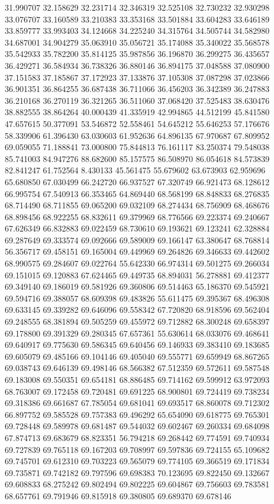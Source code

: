 31.990707
32.158629
32.231714
32.346319
32.525108
32.730232
32.930298
33.076707
33.160589
33.210383
33.353168
33.501884
33.604283
33.646189
33.859777
33.993403
34.124668
34.225240
34.315764
34.505744
34.582980
34.687001
34.904279
35.063910
35.056721
35.174088
35.340022
35.568578
35.542933
35.782200
35.814125
35.987856
36.196870
36.299275
36.435657
36.429271
36.584934
36.738326
36.880146
36.894175
37.048588
37.080900
37.151583
37.185867
37.172923
37.133876
37.105308
37.087298
37.023866
36.901351
36.864255
36.687438
36.711066
36.456203
36.342389
36.247883
36.210168
36.270119
36.321265
36.511060
37.068420
37.525483
38.630476
38.882555
38.864264
40.000439
41.335919
42.994865
44.512199
45.841580
47.657615
50.377091
53.546872
52.558461
54.645212
55.646253
57.176676
58.339906
61.396430
63.030603
61.952636
64.896135
67.970687
67.809952
69.059055
71.188841
73.000800
75.844813
76.161117
83.250374
79.548038
85.741003
84.947276
88.682600
85.157575
86.508970
86.054618
84.573839
82.841247
61.752564
8.430133
45.561475
55.679602
63.673903
62.959696
65.680850
67.030499
66.242720
66.937527
67.320749
66.921473
68.128612
66.995754
67.540913
66.353465
64.869440
68.568199
68.848833
68.276835
68.714490
68.711855
69.065200
69.032109
68.274434
68.756909
68.468676
68.898456
68.922255
68.832611
69.379969
68.776566
69.223374
69.240667
67.626349
66.832883
69.022459
68.730610
69.193621
69.123241
62.328884
69.287649
69.333574
69.092666
69.589009
69.166147
63.380647
68.768814
56.356717
69.458151
69.165004
69.449969
69.264826
69.346633
69.442602
68.990575
69.284607
69.022764
55.642330
66.974314
69.501275
69.266034
69.151015
69.120883
67.624465
69.449735
68.894031
56.278881
69.412377
69.349140
69.186019
69.581926
69.360806
69.514463
65.186370
69.545921
69.594716
69.388057
68.609398
69.483826
55.611475
69.395367
68.496308
69.633145
69.339282
69.646096
69.558342
67.720820
68.918596
69.562404
69.248555
68.381894
69.505259
69.455972
69.712882
68.300248
69.658397
69.178800
69.391329
69.280345
67.657361
55.630614
68.033076
69.468641
69.640917
69.775630
69.586345
69.640456
69.146933
69.383410
69.183685
69.605079
69.485166
69.104146
69.405040
69.555771
69.659949
68.867265
69.038743
69.646139
69.498146
68.566382
67.512359
69.572611
69.587548
69.183008
69.550351
69.654181
68.886485
69.714162
69.599912
63.972093
68.763007
69.172458
69.720481
69.691225
68.900801
69.724419
69.738234
69.318386
69.661687
67.785054
69.681041
69.693517
68.860078
69.712302
66.897752
69.585528
69.757383
69.496292
65.654090
69.618775
69.765301
69.728448
69.589978
69.681487
69.544032
69.602467
69.260334
69.684098
67.874713
69.683679
68.823351
56.794218
69.268442
69.774591
69.740934
69.727839
69.765118
69.167203
69.708997
69.597836
69.724155
65.109682
69.745701
69.612310
69.703223
69.565079
69.774105
69.366519
69.171834
69.735871
69.742182
69.797596
69.698383
70.123695
69.822450
69.132667
69.608833
68.275242
69.802494
69.802225
69.604867
69.756603
69.783581
68.657761
69.791946
69.815918
69.380805
69.689370
69.678146
